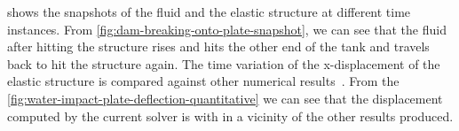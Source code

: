 \documentclass[10pt, conference]{FMFP2022}
\begin{document}
 shows the snapshots of the fluid and
the elastic structure at different time instances. From
\cref{fig:dam-breaking-onto-plate-snapshot}, we can see that the fluid after
hitting the structure rises and hits the other end of the tank and travels back
to hit the structure again. The time variation of the x-displacement of the
elastic structure is compared against other numerical
results~\cite{sun2019fully,bogaers2016evaluation}. From the
\cref{fig:water-impact-plate-deflection-quantitative} we can see that the
displacement computed by the current solver is with in a vicinity of the other
results produced.
\end{document}
